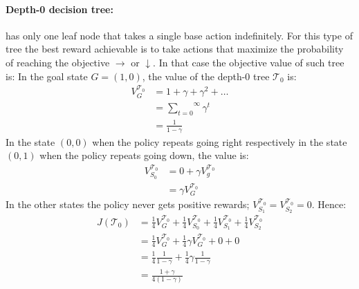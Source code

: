 \paragraph{Depth-0 decision tree:} has only one leaf node that takes a single base action indefinitely.
For this type of tree the best reward achievable is to take actions that maximize the probability of reaching the objective $\rightarrow$ or $\downarrow$. In that case the objective value of such tree is:
In the goal state $G = (1, 0)$, the value of the depth-0 tree $\mathcal{T}_0$ is:
\begin{align*}
    V^{\mathcal{T}_0}_G &= 1 + \gamma + \gamma^2 + \dots \\
    &= \overset{\infty}{\underset{t=0}\sum} \gamma^t \\
    &= \frac{1}{1 - \gamma}
\end{align*}
In the state $(0, 0)$ when the policy repeats going right respectively in the state $(0, 1)$ when the policy repeats going down, the value is:
\begin{align*}
    V^{\mathcal{T}_0}_{S_0} &= 0 + \gamma V^{\mathcal{T}_0}_g \\
    &= \gamma V^{\mathcal{T}_0}_G
\end{align*}
In the other states the policy never gets positive rewards; $V^{\mathcal{T}_0}_{S_1} = V^{\mathcal{T}_0}_{S_2} = 0$. Hence:
\begin{align*}
J(\mathcal{T}_0) &= \frac{1}{4} V^{\mathcal{T}_0}_G + \frac{1}{4} V^{\mathcal{T}_0}_{S_0}+ \frac{1}{4} V^{\mathcal{T}_0}_{S_1}+ \frac{1}{4} V^{\mathcal{T}_0}_{S_2} \\
&= \frac{1}{4} V^{\mathcal{T}_0}_G + \frac{1}{4} \gamma V^{\mathcal{T}_0}_G + 0 + 0\\
&= \frac{1}{4} \frac{1}{1 - \gamma} + \frac{1}{4} \gamma \frac{1}{1 - \gamma} \\
&= \frac{1 + \gamma}{4(1 - \gamma)}
\end{align*}
